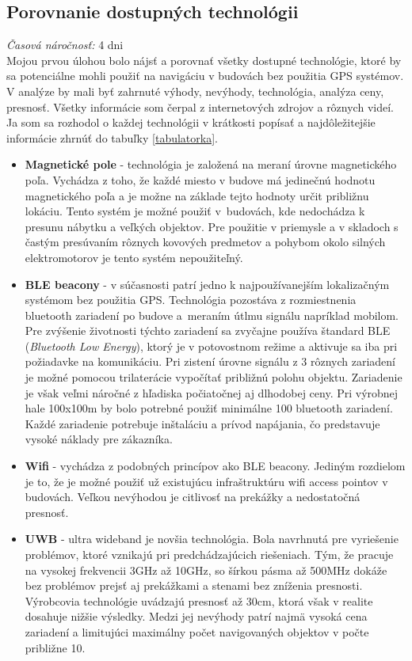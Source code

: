 \documentclass[11pt, oneside]{report}
\begin{document}
\subsection{Porovnanie dostupných technológii}
\textit{Časová náročnosť:} 4 dni\\
Mojou prvou úlohou bolo nájsť a  porovnať všetky dostupné technológie, ktoré  by sa potenciálne mohli použiť na navigáciu v budovách bez použitia GPS systémov. V analýze by mali byť zahrnuté  výhody, nevýhody,  technológia, analýza ceny, presnosť. Všetky informácie som čerpal z internetových zdrojov\cite{lee2007comparative} a rôznych videí. Ja som sa rozhodol o každej technológii v krátkosti popísať a najdôležitejšie informácie zhrnúť do tabuľky \ref{tabulatorka}.
\begin{itemize}
\item\textbf{Magnetické pole} - technológia je založená na  meraní úrovne magnetického poľa. Vychádza z toho, že každé miesto v budove má jedinečnú hodnotu magnetického poľa a je možne na základe tejto hodnoty určit približnu lokáciu. Tento systém je možné použiť v~budovách, kde nedochádza k  presunu nábytku a  veľkých objektov. Pre použitie v priemysle a v skladoch  s častým presúvaním rôznych kovových predmetov  a pohybom okolo silných elektromotorov je tento systém nepoužiteľný.
\item\textbf{BLE beacony} - v súčasnosti patrí jedno k najpoužívanejším  lokalizačným systémom  bez použitia GPS. Technológia pozostáva  z rozmiestnenia bluetooth zariadení po budove a~meraním útlmu signálu  napríklad mobilom. Pre zvýšenie životnosti týchto zariadení sa zvyčajne používa štandard BLE (\textit{Bluetooth Low Energy}), ktorý je v potovostnom režime a aktivuje sa iba pri požiadavke na komunikáciu. Pri  zistení úrovne signálu z  3 rôznych zariadení je možné pomocou trilaterácie\citep{trilat} vypočítať približnú polohu objektu. Zariadenie je však veľmi náročné z hľadiska počiatočnej aj dlhodobej  ceny. Pri výrobnej hale  100x100m by bolo potrebné použiť minimálne 100 bluetooth zariadení. Každé zariadenie potrebuje inštaláciu a prívod napájania, čo predstavuje vysoké náklady pre zákazníka. 
\item\textbf{Wifi} - vychádza z podobných princípov ako BLE beacony. Jediným rozdielom je to, že je možné použiť už existujúcu infraštruktúru wifi access pointov v budovách. Veľkou nevýhodou je citlivosť na prekážky a nedostatočná presnosť.
\item\textbf{UWB} - ultra wideband je novšia technológia. Bola navrhnutá pre vyriešenie problémov, ktoré vznikajú pri predchádzajúcich riešeniach. Tým, že pracuje na  vysokej frekvencii 3GHz až 10GHz, so šírkou pásma až 500MHz dokáže  bez problémov prejsť aj prekážkami a stenami bez zníženia presnosti. Výrobcovia technológie uvádzajú presnosť až 30cm, ktorá však v realite dosahuje nižšie výsledky. Medzi jej nevýhody patrí najmä vysoká cena zariadení a limitujúci maximálny počet navigovaných objektov v počte približne 10.

\end{itemize}
\end{document}
